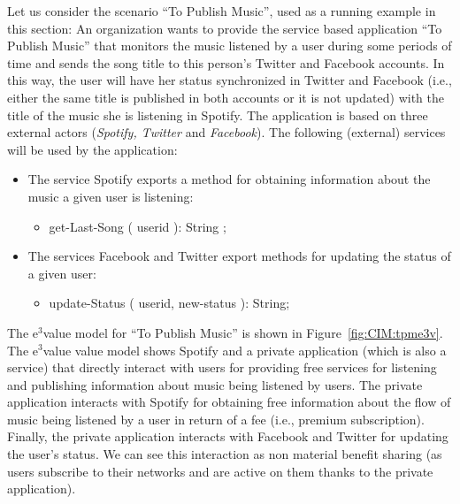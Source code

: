 \begin{example}\label{ex:toPublicMusic}
Let us consider the scenario ``To Publish Music'', used as a running example in this section:
An organization wants to provide the service based application ``To Publish Music'' that monitors the music listened by a user during some periods of time and sends the song title  to this person's Twitter and Facebook accounts. 
In this way, the user will have her status synchronized in  Twitter and Facebook (i.e., either the same title is published in both accounts or it is not updated) with the title of the music she is listening in Spotify.
The application is based on three external actors ({\em Spotify, Twitter} and {\em Facebook}).
The following (external) services will be used by the application:
\begin{itemize}
\item The  service   Spotify exports a meth\-od for obtaining information  about the music a given user is listening:
\begin{itemize} \item {\sf\small get-Last-Song ( userid ): String} ; \end{itemize}
\item The services Facebook and Twitter export meth\-ods for  updating the status of a given user:
\begin{itemize} 
\item {\sf\small update-Status ( userid, new-status ): String}; 
\end{itemize}
\end{itemize}




The e$^3$value model for ``To Publish Music'' is shown in Figure~\ref{fig:CIM:tpme3v}. 
The e$^3$value value model shows Spotify and a private application (which is also a service) that directly interact with users for providing free services for listening and publishing information about music being listened by users. The private application interacts with Spotify for obtaining free information about the flow of music being listened by a user in return of a fee (i.e., premium subscription). Finally, the private application interacts with Facebook and Twitter for updating the user's status.
We can see this interaction as non material benefit sharing (as users subscribe to their networks and are active on them thanks to the private application).
\end{example}

